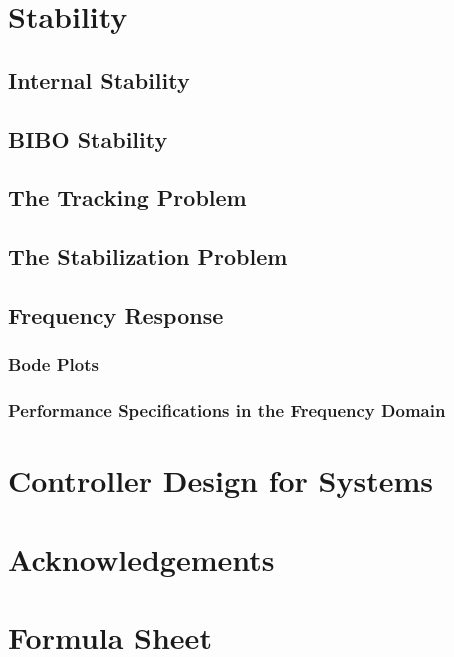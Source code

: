 \documentclass[10pt]{article}
\begin{document}
\section{Stability}
\subsection{Internal Stability}
\subsection{BIBO Stability}
\subsection{The Tracking Problem}
\subsection{The Stabilization Problem}
\subsection{Frequency Response}
\subsubsection{Bode Plots}
\subsubsection{Performance Specifications in the Frequency Domain}


\section{Controller Design for Systems}


\section{Acknowledgements}


\section{Formula Sheet}
\end{document}
